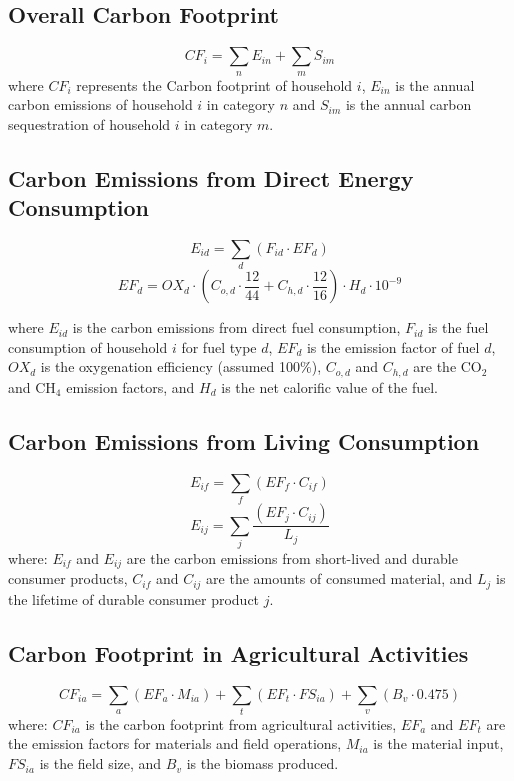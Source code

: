 \documentclass[12pt,a4paper]{article}%
\begin{document}
\subsection{Overall Carbon Footprint}
\begin{equation}
CF_i = \sum_{n} E_{in} + \sum_{m} S_{im}
\end{equation}
where $CF_i$ represents the Carbon footprint of household $i$, $E_{in}$ is the annual carbon emissions of household $i$ in category $n$ and $S_{im}$ is the annual carbon sequestration of household $i$ in category $m$.


\subsection{Carbon Emissions from Direct Energy Consumption}
\begin{equation}
E_{id} = \sum_d (F_{id} \cdot EF_d)
\end{equation}
\begin{equation}
EF_d = OX_d \cdot \left(C_{o,d} \cdot \frac{12}{44} + C_{h,d} \cdot \frac{12}{16}\right) \cdot H_d \cdot 10^{-9}
\end{equation}

where $E_{id}$ is the carbon emissions from direct fuel consumption, $F_{id}$ is the fuel consumption of household $i$ for fuel type $d$, $EF_d$ is the emission factor of fuel $d$, $OX_d$ is the oxygenation efficiency (assumed 100\%), $C_{o,d}$ and $C_{h,d}$ are the CO$_2$ and CH$_4$ emission factors, and $H_d$ is the net calorific value of the fuel.


\subsection{Carbon Emissions from Living Consumption}
\begin{equation}
E_{if} = \sum_f (EF_f \cdot C_{if})
\end{equation}
\begin{equation}
E_{ij} = \sum_j \frac{(EF_j \cdot C_{ij})}{L_j}
\end{equation}
where: $E_{if}$ and $E_{ij}$ are the carbon emissions from short-lived and durable consumer products, $C_{if}$ and $C_{ij}$ are the amounts of consumed material, and $L_j$ is the lifetime of durable consumer product $j$.


\subsection{Carbon Footprint in Agricultural Activities}
\begin{equation}
CF_{ia} = \sum_a (EF_a \cdot M_{ia}) + \sum_t (EF_t \cdot FS_{ia}) + \sum_v (B_v \cdot 0.475)
\end{equation}
where: $CF_{ia}$ is the carbon footprint from agricultural activities, $EF_a$ and $EF_t$ are the emission factors for materials and field operations, $M_{ia}$ is the material input, $FS_{ia}$ is the field size, and $B_v$ is the biomass produced.
\end{document}
